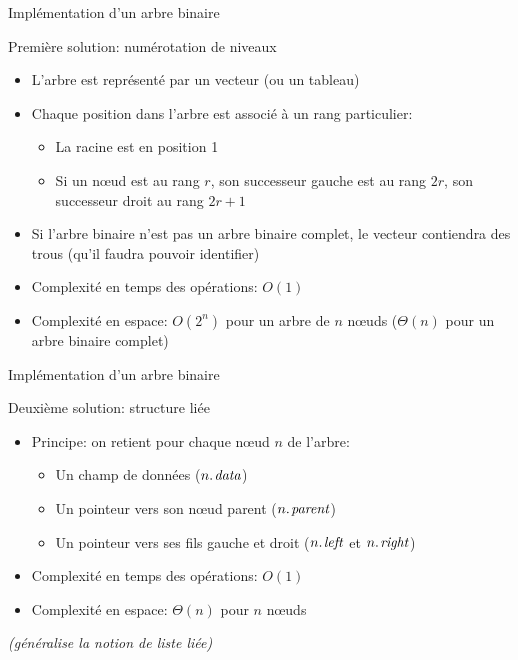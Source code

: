 \begin{frame}{Implémentation d'un arbre binaire}

Première solution: \alert{numérotation de niveaux}
\begin{itemize}
\item L'arbre est représenté par un vecteur (ou un tableau)
\item Chaque position dans l'arbre est associé à un rang particulier:
\begin{itemize}
\item La racine est en position 1
\item Si un n\oe ud est au rang $r$, son successeur gauche est au rang $2r$, son successeur droit au rang $2r+1$
\end{itemize}
\item Si l'arbre binaire n'est pas un arbre binaire complet, le vecteur contiendra des trous (qu'il faudra pouvoir identifier)
\item Complexité en temps des opérations: $O(1)$
\item Complexité en espace: $O(2^n)$ pour un arbre de $n$ n\oe uds ($\Theta(n)$ pour un arbre binaire complet)
\end{itemize}


\end{frame}

\begin{frame}{Implémentation d'un arbre binaire}

Deuxième solution: \alert{structure liée}
\begin{itemize}
\item Principe: on retient pour chaque n\oe ud $n$ de l'arbre:
\begin{itemize}
\item Un champ de données ($\attrib{n}{data}$)
\item Un pointeur vers son n\oe ud parent ($\attrib{n}{parent}$)
\item Un pointeur vers ses fils gauche et droit ($\attrib{n}{left}$ et $\attrib{n}{right}$)
\end{itemize}
\item Complexité en temps des opérations: $O(1)$
\item Complexité en espace: $\Theta(n)$ pour $n$ n\oe uds
\end{itemize}

\bigskip

{\it (généralise la notion de liste liée)}

\end{frame}

